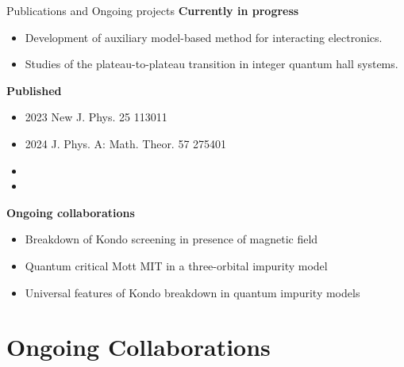 \documentclass[11pt,aspectratio=169]{beamer}
\newcommand\focus[1]{%
	{\alert{\textbf{#1}}}
}
\begin{document}
\begin{frame}{Publications and Ongoing projects}
\focus{Currently in progress}
\begin{itemize}
	\item Development of auxiliary model-based method for interacting electronics.
	\item Studies of the plateau-to-plateau transition in integer quantum hall systems.
\end{itemize}

\vspace*{\fill}

\focus{Published}\\[5pt]

\begin{minipage}{0.49\textwidth}
\begin{itemize}
	\item 2023 New J. Phys. 25 113011
	\item 2024 J. Phys. A: Math. Theor. 57 275401
\end{itemize}
\end{minipage}
\begin{minipage}{0.49\textwidth}
\begin{itemize}
	\item {}
	\item {}
\end{itemize}
\end{minipage}

\vspace*{\fill}

\focus{Ongoing collaborations}

\begin{itemize}
	\item Breakdown of Kondo screening in presence of magnetic field
	\item Quantum critical Mott MIT in a three-orbital impurity model
	\item Universal features of Kondo breakdown in quantum impurity models
\end{itemize}
\end{frame}

\section{Ongoing Collaborations}
\end{document}
